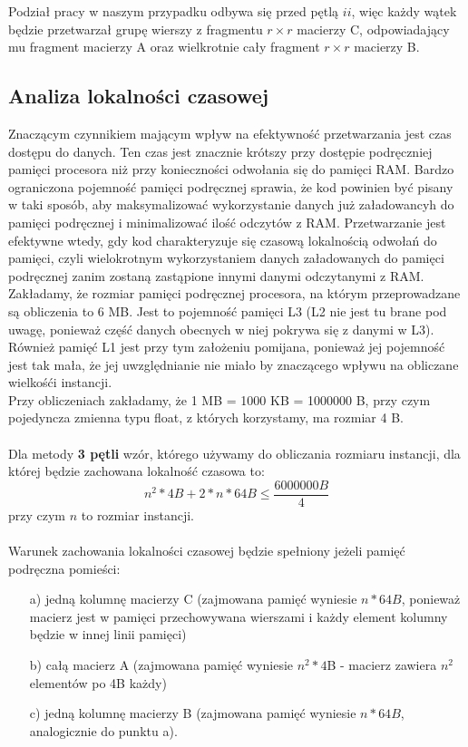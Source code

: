 \documentclass[10pt,a4paper]{article}
\begin{document}
Podział pracy w naszym przypadku odbywa się przed pętlą $ii$, więc każdy wątek będzie przetwarzał grupę wierszy z fragmentu $r \times r$ macierzy C,
odpowiadający mu fragment macierzy A oraz wielkrotnie cały fragment $r \times r$ macierzy B.

\newpage

\subsection{Analiza lokalności czasowej}
Znaczącym czynnikiem mającym wpływ na efektywność przetwarzania jest czas dostępu do
danych. Ten czas jest znacznie krótszy przy dostępie podręczniej pamięci procesora niż
przy konieczności odwołania się do pamięci RAM. Bardzo ograniczona pojemność pamięci
podręcznej sprawia, że kod powinien być pisany w taki sposób, aby maksymalizować
wykorzystanie danych już załadowancyh do pamięci podręcznej i minimalizować ilość
odczytów z RAM. Przetwarzanie jest efektywne wtedy, gdy kod charakteryzuje się
czasową lokalnością odwołań do pamięci, czyli wielokrotnym wykorzystaniem danych załadowanych
do pamięci podręcznej zanim zostaną zastąpione innymi danymi odczytanymi z RAM.\\
Zakładamy, że rozmiar pamięci podręcznej procesora, na którym przeprowadzane są
obliczenia to 6 MB. Jest to pojemność pamięci L3 (L2 nie jest tu brane pod uwagę,
ponieważ część danych obecnych w niej pokrywa się z danymi w L3). Również pamięć L1
jest przy tym założeniu pomijana, ponieważ jej pojemność jest tak mała, że jej uwzględnianie
nie miało by znaczącego wpływu na obliczane wielkośći instancji.\\
Przy obliczeniach zakładamy, że 1 MB = 1000 KB = 1000000 B, przy czym pojedyncza zmienna typu
float, z których korzystamy, ma rozmiar 4 B.\\
\\
Dla metody \textbf{3 pętli} wzór, którego używamy do obliczania rozmiaru instancji, dla której
będzie zachowana lokalność czasowa to:
\begin{equation}
	n^2 * 4B + 2 * n * 64B \leq \frac{6000000B}{4}
\end{equation}
przy czym $n$ to rozmiar instancji.\\\\
Warunek zachowania lokalności czasowej będzie spełniony jeżeli pamięć podręczna pomieści:
\begin{enumerate} \itemsep0pt
	\item[a)] jedną kolumnę macierzy C (zajmowana pamięć wyniesie $n * 64B$, ponieważ macierz jest w pamięci
	      przechowywana wierszami i każdy element kolumny będzie w innej linii pamięci)
	\item[b)] całą macierz A (zajmowana pamięć wyniesie $n^2 * 4$B - macierz zawiera $n^2$ elementów po 4B każdy)
	\item[c)] jedną kolumnę macierzy B (zajmowana pamięć wyniesie $n * 64B$, analogicznie do punktu a).
\end{enumerate}
\end{document}
